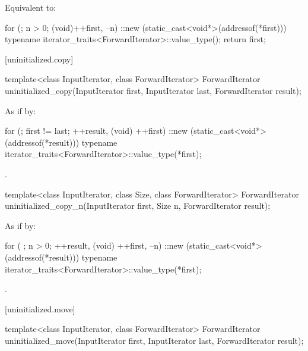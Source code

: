 \begin{itemdescr}
\pnum
\effects
Equivalent to:
\begin{codeblock}
for (; n > 0; (void)++first, --n)
  ::new (static_cast<void*>(addressof(*first)))
    typename iterator_traits<ForwardIterator>::value_type();
return first;
\end{codeblock}
\end{itemdescr}

[uninitialized.copy]{}

%
\begin{itemdecl}
template<class InputIterator, class ForwardIterator>
  ForwardIterator uninitialized_copy(InputIterator first, InputIterator last,
                                     ForwardIterator result);
\end{itemdecl}

\begin{itemdescr}
\pnum
\effects
As if by:
\begin{codeblock}
for (; first != last; ++result, (void) ++first)
  ::new (static_cast<void*>(addressof(*result)))
    typename iterator_traits<ForwardIterator>::value_type(*first);
\end{codeblock}

\pnum
\returns
{}.
\end{itemdescr}

%
\begin{itemdecl}
template<class InputIterator, class Size, class ForwardIterator>
  ForwardIterator uninitialized_copy_n(InputIterator first, Size n, ForwardIterator result);
\end{itemdecl}

\begin{itemdescr}
\pnum
\effects
As if by:
\begin{codeblock}
for ( ; n > 0; ++result, (void) ++first, --n) {
  ::new (static_cast<void*>(addressof(*result)))
    typename iterator_traits<ForwardIterator>::value_type(*first);
}
\end{codeblock}

\pnum
\returns {}.
\end{itemdescr}

[uninitialized.move]{}

%
\begin{itemdecl}
template<class InputIterator, class ForwardIterator>
  ForwardIterator uninitialized_move(InputIterator first, InputIterator last,
                                     ForwardIterator result);
\end{itemdecl}

